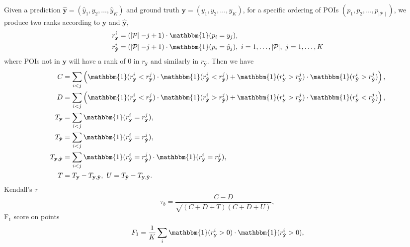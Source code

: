 Given a prediction $\hat{\mathbf{y}} = (\hat{y}_1, \hat{y}_2, \dots, \hat{y}_K)$ and ground truth $\mathbf{y} = (y_1, y_2, \dots, y_K)$,
for a specific ordering of POIs $(p_1, p_2, \dots, p_{\mid\mathcal{P}\mid})$,
we produce two ranks according to $\mathbf{y}$ and $\hat{\mathbf{y}}$,
\begin{align*}
r_{\mathbf{y}}^i       &= (\mid\!\! \mathcal{P} \!\!\mid - j + 1) \cdot \mathbbm{1}(p_i = y_j), \\
r_{\hat{\mathbf{y}}}^i &= (\mid\!\! \mathcal{P} \!\!\mid - j + 1) \cdot \mathbbm{1}(p_i = \hat{y}_j),~ 
i = 1, \dots, \mid\!\! \mathcal{P} \!\!\mid,~ j = 1, \dots, K
\end{align*}
where POIs not in $\mathbf{y}$ will have a rank of $0$ in $r_{\mathbf{y}}$ and similarly in $r_{\hat{\mathbf{y}}}$.
Then we have
\begin{align*}
C &= \sum_{i < j} \left(\mathbbm{1}(r_{\mathbf{y}}^i < r_{\mathbf{y}}^j) \cdot \mathbbm{1}(r_{\hat{\mathbf{y}}}^i < r_{\hat{\mathbf{y}}}^j) +
     \mathbbm{1}(r_{\mathbf{y}}^i > r_{\mathbf{y}}^j) \cdot \mathbbm{1}(r_{\hat{\mathbf{y}}}^i > r_{\hat{\mathbf{y}}}^j) \right), \\
D &= \sum_{i < j} \left(\mathbbm{1}(r_{\mathbf{y}}^i < r_{\mathbf{y}}^j) \cdot \mathbbm{1}(r_{\hat{\mathbf{y}}}^i > r_{\hat{\mathbf{y}}}^j) +
     \mathbbm{1}(r_{\mathbf{y}}^i > r_{\mathbf{y}}^j) \cdot \mathbbm{1}(r_{\hat{\mathbf{y}}}^i < r_{\hat{\mathbf{y}}}^j) \right), \\
T_{\mathbf{y}}       &= \sum_{i < j} \mathbbm{1}(r_{\mathbf{y}}^i = r_{\mathbf{y}}^j), \\
T_{\hat{\mathbf{y}}} &= \sum_{i < j} \mathbbm{1}(r_{\hat{\mathbf{y}}}^i = r_{\hat{\mathbf{y}}}^j), \\
T_{\mathbf{y},\hat{\mathbf{y}}} &= \sum_{i < j} \mathbbm{1}(r_{\hat{\mathbf{y}}}^i = r_{\hat{\mathbf{y}}}^j) \cdot
                                   \mathbbm{1}(r_{\mathbf{y}}^i = r_{\mathbf{y}}^j), \\
T &= T_{\mathbf{y}} - T_{\mathbf{y},\hat{\mathbf{y}}},~ U = T_{\hat{\mathbf{y}}} - T_{\mathbf{y},\hat{\mathbf{y}}}.
\end{align*}
\noindent
Kendall's $\tau$
\begin{equation*}
\tau_b = \frac{C - D}{\sqrt{(C + D + T) (C + D + U)}},
\end{equation*}
F$_1$ score on points 
\begin{equation*}
F_1 = \frac{1}{K} \sum_i \mathbbm{1}(r_{\mathbf{y}}^i > 0) \cdot \mathbbm{1}(r_{\hat{\mathbf{y}}}^i > 0),
\end{equation*}
